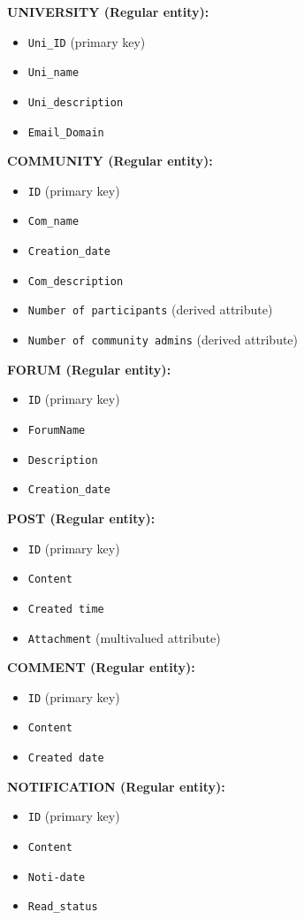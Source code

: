 \noindent\textbf{UNIVERSITY (Regular entity):}
\begin{itemize}
    \item \texttt{Uni\_ID} (primary key)
    \item \texttt{Uni\_name}
    \item \texttt{Uni\_description}
    \item \texttt{Email\_Domain}
\end{itemize}

\noindent\textbf{COMMUNITY (Regular entity):}
\begin{itemize}
    \item \texttt{ID} (primary key)
    \item \texttt{Com\_name}
    \item \texttt{Creation\_date}
    \item \texttt{Com\_description}
    \item \texttt{Number of participants} (derived attribute)
    \item \texttt{Number of community admins} (derived attribute)
\end{itemize}

\noindent\textbf{FORUM (Regular entity):}
\begin{itemize}
    \item \texttt{ID} (primary key)
    \item \texttt{ForumName}
    \item \texttt{Description}
    \item \texttt{Creation\_date}
\end{itemize}

\noindent\textbf{POST (Regular entity):}
\begin{itemize}
    \item \texttt{ID} (primary key)
    \item \texttt{Content}
    \item \texttt{Created time}
    \item \texttt{Attachment} (multivalued attribute)
\end{itemize}

\noindent\textbf{COMMENT (Regular entity):}
\begin{itemize}
    \item \texttt{ID} (primary key)
    \item \texttt{Content}
    \item \texttt{Created date}
\end{itemize}

\noindent\textbf{NOTIFICATION (Regular entity):}
\begin{itemize}
    \item \texttt{ID} (primary key)
    \item \texttt{Content}
    \item \texttt{Noti-date}
    \item \texttt{Read\_status}
\end{itemize}

